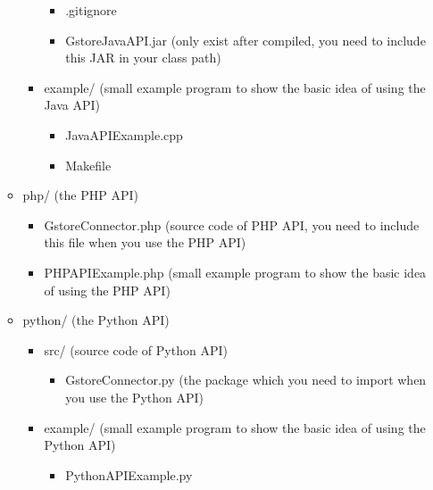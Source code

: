 \documentclass[titlepage, a4paper, 12pt]{article}
\begin{document}
\begin{itemize}
\begin{itemize}
\begin{itemize}
      \begin{itemize}
      \item
        .gitignore
      \item
        GstoreJavaAPI.jar (only exist after compiled, you need to
        include this JAR in your class path)
      \end{itemize}
    \item
      example/ (small example program to show the basic idea of using
      the Java API)

      \begin{itemize}
      \item
        JavaAPIExample.cpp
      \item
        Makefile
      \end{itemize}
    \end{itemize}

   \item
    php/ (the PHP API)

    \begin{itemize}
    \item
      GstoreConnector.php (source code of PHP API, you need to include this file when you use the PHP API)

    \item
      PHPAPIExample.php (small example program to show the basic idea of using the PHP API)
    \end{itemize}

  \item
    python/ (the Python API)
    \begin{itemize}
    \item
      src/ (source code of Python API)
      \begin{itemize}
      \item
        GstoreConnector.py (the package which you need to import when you use the Python API)
      \end{itemize}
    \item
      example/ (small example program to show the basic idea of using the Python API)
      \begin{itemize}
      \item
        PythonAPIExample.py
      \end{itemize}
    \end{itemize}

  \end{itemize}
\end{itemize}
\end{document}
